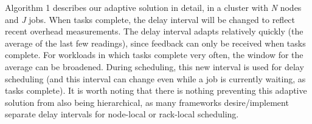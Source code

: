 Algorithm 1 describes our adaptive solution in detail, in a cluster with \textit{N} nodes and \textit{J} jobs. 
When tasks complete, the delay interval will be changed to reflect 
recent overhead measurements. The delay interval adapts relatively quickly (the average of
the last few readings), since feedback can only be received when tasks complete. For workloads
in which tasks complete very often, the window for the average can be broadened. 
During scheduling, this new interval is used for delay scheduling (and this interval can 
change even while a job is currently waiting, as tasks complete). It is worth noting that 
there is nothing preventing this adaptive solution from also being hierarchical, as many 
frameworks desire/implement separate delay intervals for node-local or rack-local scheduling.

